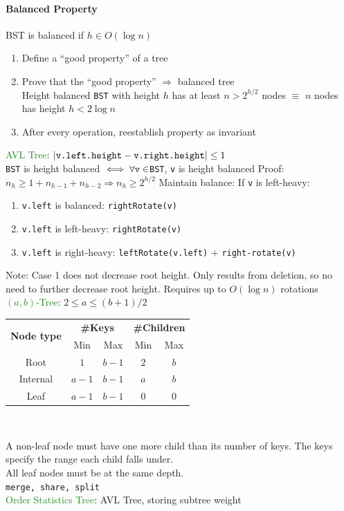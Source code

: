 \paragraph{Balanced Property}
BST is balanced if $h\in O(\log n)$
\begin{enumerate}
  \item Define a ``good property'' of a tree
  \item Prove that the ``good property'' $\Rightarrow$ balanced tree\\
    Height balanced \verb|BST| with height $h$ has at least $n>2^{h/2}$ nodes
    $\equiv$ $n$ nodes has height $h<2\log n$
  \item After every operation, reestablish property as invariant
\end{enumerate}
\textcolor{ForestGreen}{AVL Tree}:
$|\verb|v.left.height|-\verb|v.right.height||\le1$\\
\verb|BST| is height balanced $\iff\forall \verb|v|\in$\verb|BST|, \verb|v| is height balanced
Proof: $n_{h}\ge 1+n_{h-1}+n_{h-2}\Rightarrow n_{h}\ge2^{h/2}$
Maintain balance: If \verb|v| is left-heavy:
\begin{enumerate}
  \item \verb|v.left| is balanced: \verb|rightRotate(v)|
  \item \verb|v.left| is left-heavy: \verb|rightRotate(v)|
  \item \verb|v.left| is right-heavy: \verb|leftRotate(v.left)| + \verb|right-rotate(v)|
\end{enumerate}
\textcolor{Bittersweet}{Note}: Case 1 does not decrease root height. Only
results from deletion, so no need to further decrease root height. Requires up
to $O(\log n)$ rotations\\
\textcolor{ForestGreen}{$(a,b)$-Tree}: $2\le a\le (b+1)/2$\\
\begin{center}
\vspace{-3mm}
\begin{tabular}{c  c  c  c  c}
  \multirow{2}{*}{\textbf{Node type}} & \multicolumn{2}{c}{\textbf{\#Keys}} & \multicolumn{2}{c}{\textbf{\#Children}}\\
                             & Min & Max & Min & Max\\\midrule
  Root & $1$ & $b-1$ & $2$ & $b$\\
  Internal & $a-1$ & $b-1$ & $a$ & $b$\\
  Leaf & $a-1$ & $b-1$ & $0$ & $0$
\end{tabular}\\
\end{center}
A non-leaf node must have one more child than its number of keys. The keys
specify the range each child falls under.\\
All leaf nodes must be at the same depth.\\
\verb|merge, share, split|\\
\textcolor{ForestGreen}{Order Statistics Tree}: AVL Tree, storing subtree weight
